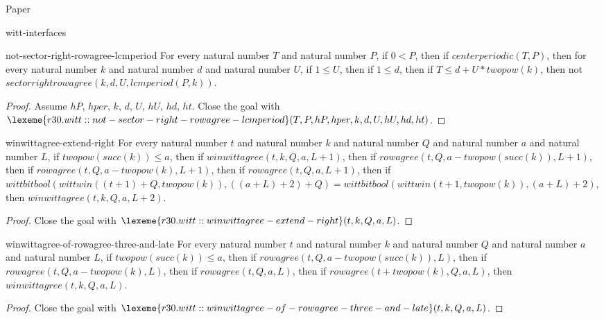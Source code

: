 \begin{lexlean}{Paper}
\begin{section}{witt-interfaces}
  \begin{theorem}{not-sector-right-rowagree-lcmperiod}
  For every natural number \(T\) and natural number \(P\), if \(0 < P\), then if \(centerperiodic(T, P)\), then for every natural number \(k\) and natural number \(d\) and natural number \(U\), if \(1 ≤ U\), then if \(1 ≤ d\), then if \(T ≤ d + U * twopow(k)\), then not \(sectorrightrowagree(k, d, U, lcmperiod(P, k))\).
  \begin{proof}
  Assume \(hP\), \(hper\), \(k\), \(d\), \(U\), \(hU\), \(hd\), \(ht\).
  Close the goal with \(\lexeme{r30.witt::not-sector-right-rowagree-lcmperiod}(T, P, hP, hper, k, d, U, hU, hd, ht)\).
  \end{proof}
  \end{theorem}

  \begin{theorem}{winwittagree-extend-right}
  For every natural number \(t\) and natural number \(k\) and natural number \(Q\) and natural number \(a\) and natural number \(L\), if \(twopow(succ(k)) ≤ a\), then if \(winwittagree(t, k, Q, a, L + 1)\), then if \(rowagree(t, Q, a - twopow(succ(k)), L + 1)\), then if \(rowagree(t, Q, a - twopow(k), L + 1)\), then if \(rowagree(t, Q, a, L + 1)\), then if \(wittbitbool(wittwin((t + 1) + Q, twopow(k)), ((a + L) + 2) + Q) = wittbitbool(wittwin(t + 1, twopow(k)), (a + L) + 2)\), then \(winwittagree(t, k, Q, a, L + 2)\).
  \begin{proof}
  Close the goal with \(\lexeme{r30.witt::winwittagree-extend-right}(t, k, Q, a, L)\).
  \end{proof}
  \end{theorem}

  \begin{theorem}{winwittagree-of-rowagree-three-and-late}
  For every natural number \(t\) and natural number \(k\) and natural number \(Q\) and natural number \(a\) and natural number \(L\), if \(twopow(succ(k)) ≤ a\), then if \(rowagree(t, Q, a - twopow(succ(k)), L)\), then if \(rowagree(t, Q, a - twopow(k), L)\), then if \(rowagree(t, Q, a, L)\), then if \(rowagree(t + twopow(k), Q, a, L)\), then \(winwittagree(t, k, Q, a, L)\).
  \begin{proof}
  Close the goal with \(\lexeme{r30.witt::winwittagree-of-rowagree-three-and-late}(t, k, Q, a, L)\).
  \end{proof}
  \end{theorem}


\end{section}
\end{lexlean}
